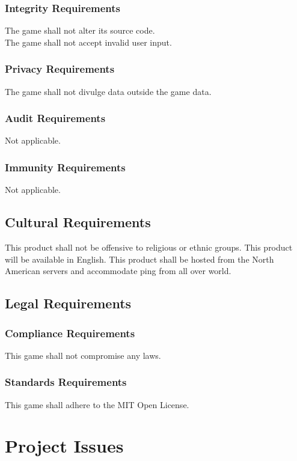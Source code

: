 \documentclass[11pt, oneside]{article}   	%
\begin{document}
\subsubsection{Integrity Requirements}
The game shall not alter its source code.\\
The game shall not accept invalid user input.\\


\subsubsection{Privacy Requirements}
The game shall not divulge data outside the game data.


\subsubsection{Audit Requirements}
Not applicable.


\subsubsection{Immunity Requirements}
Not applicable.


\subsection{Cultural Requirements}
This product shall not be offensive to religious or ethnic groups. This product will be available in English. This product shall be hosted from the North American servers and accommodate ping from all over world.


\subsection{Legal Requirements}
\subsubsection{Compliance Requirements}
This game shall not compromise any laws.


\subsubsection{Standards Requirements}
This game shall adhere to the MIT Open License.


\newpage
\section{Project Issues}
\end{document}
